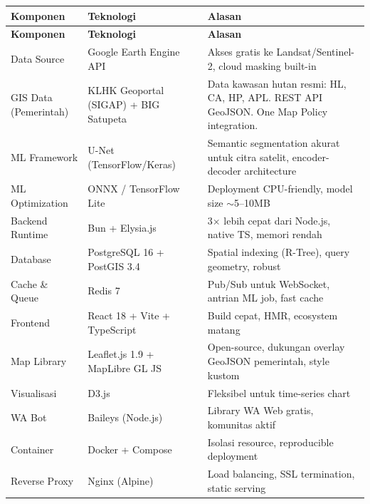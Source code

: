 \documentclass[11pt,a4paper]{article}
\begin{document}
\begin{longtable}{p{3cm} p{3.5cm} p{7cm}}
    \toprule
    \textbf{Komponen} & \textbf{Teknologi} & \textbf{Alasan} \\
    \midrule
    \endfirsthead
    \toprule
    \textbf{Komponen} & \textbf{Teknologi} & \textbf{Alasan} \\
    \midrule
    \endhead
    \hline
    \endfoot
    \bottomrule
    \endlastfoot

    Data Source
    & Google Earth Engine API
    & Akses gratis ke Landsat/Sentinel-2, cloud masking built-in \\

    GIS Data \newline (Pemerintah)
    & KLHK Geoportal (SIGAP) \newline + BIG Satupeta
    & Data kawasan hutan resmi: HL, CA, HP, APL. REST API GeoJSON. One Map Policy integration. \\

    ML Framework
    & U-Net (TensorFlow/Keras)
    & Semantic segmentation akurat untuk citra satelit, encoder-decoder architecture \\

    ML Optimization
    & ONNX / TensorFlow Lite
    & Deployment CPU-friendly, model size $\sim$5--10MB \\

    Backend Runtime
    & Bun + Elysia.js
    & 3$\times$ lebih cepat dari Node.js, native TS, memori rendah \\

    Database
    & PostgreSQL 16 + PostGIS 3.4
    & Spatial indexing (R-Tree), query geometry, robust \\

    Cache \& Queue
    & Redis 7
    & Pub/Sub untuk WebSocket, antrian ML job, fast cache \\

    Frontend
    & React 18 + Vite + TypeScript
    & Build cepat, HMR, ecosystem matang \\

    Map Library
    & Leaflet.js 1.9 \newline + MapLibre GL JS
    & Open-source, dukungan overlay GeoJSON pemerintah, style kustom \\

    Visualisasi
    & D3.js
    & Fleksibel untuk time-series chart \\

    WA Bot
    & Baileys (Node.js)
    & Library WA Web gratis, komunitas aktif \\

    Container
    & Docker + Compose
    & Isolasi resource, reproducible deployment \\

    Reverse Proxy
    & Nginx (Alpine)
    & Load balancing, SSL termination, static serving \\

\end{longtable}
\end{document}
